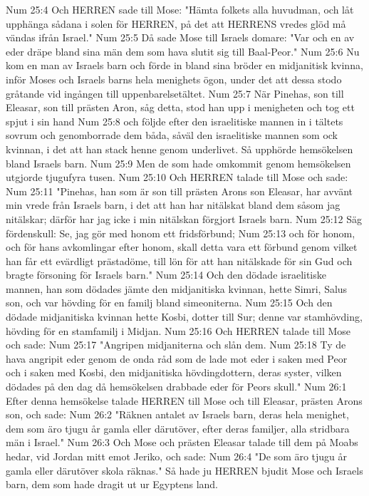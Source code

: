 Num 25:4  Och HERREN sade till Mose: "Hämta folkets alla huvudman, och låt upphänga sådana i solen för HERREN, på det att HERRENS vredes glöd må vändas ifrån Israel."
Num 25:5  Då sade Mose till Israels domare: "Var och en av eder dräpe bland sina män dem som hava slutit sig till Baal-Peor."
Num 25:6  Nu kom en man av Israels barn och förde in bland sina bröder en midjanitisk kvinna, inför Moses och Israels barns hela menighets ögon, under det att dessa stodo gråtande vid ingången till uppenbarelsetältet.
Num 25:7  När Pinehas, son till Eleasar, son till prästen Aron, såg detta, stod han upp i menigheten och tog ett spjut i sin hand
Num 25:8  och följde efter den israelitiske mannen in i tältets sovrum och genomborrade dem båda, såväl den israelitiske mannen som ock kvinnan, i det att han stack henne genom underlivet. Så upphörde hemsökelsen bland Israels barn.
Num 25:9  Men de som hade omkommit genom hemsökelsen utgjorde tjugufyra tusen.
Num 25:10  Och HERREN talade till Mose och sade:
Num 25:11  "Pinehas, han som är son till prästen Arons son Eleasar, har avvänt min vrede från Israels barn, i det att han har nitälskat bland dem såsom jag nitälskar; därför har jag icke i min nitälskan förgjort Israels barn.
Num 25:12  Säg fördenskull: Se, jag gör med honom ett fridsförbund;
Num 25:13  och för honom, och för hans avkomlingar efter honom, skall detta vara ett förbund genom vilket han får ett evärdligt prästadöme, till lön för att han nitälskade för sin Gud och bragte försoning för Israels barn."
Num 25:14  Och den dödade israelitiske mannen, han som dödades jämte den midjanitiska kvinnan, hette Simri, Salus son, och var hövding för en familj bland simeoniterna.
Num 25:15  Och den dödade midjanitiska kvinnan hette Kosbi, dotter till Sur; denne var stamhövding, hövding för en stamfamilj i Midjan.
Num 25:16  Och HERREN talade till Mose och sade:
Num 25:17  "Angripen midjaniterna och slån dem.
Num 25:18  Ty de hava angripit eder genom de onda råd som de lade mot eder i saken med Peor och i saken med Kosbi, den midjanitiska hövdingdottern, deras syster, vilken dödades på den dag då hemsökelsen drabbade eder för Peors skull."
Num 26:1  Efter denna hemsökelse talade HERREN till Mose och till Eleasar, prästen Arons son, och sade:
Num 26:2  "Räknen antalet av Israels barn, deras hela menighet, dem som äro tjugu år gamla eller därutöver, efter deras familjer, alla stridbara män i Israel."
Num 26:3  Och Mose och prästen Eleasar talade till dem på Moabs hedar, vid Jordan mitt emot Jeriko, och sade:
Num 26:4  "De som äro tjugu år gamla eller därutöver skola räknas." Så hade ju HERREN bjudit Mose och Israels barn, dem som hade dragit ut ur Egyptens land.
